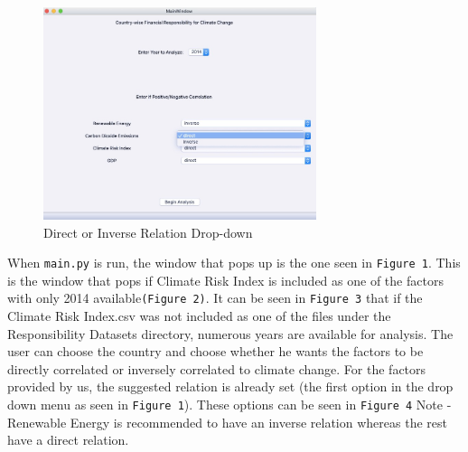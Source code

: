 \documentclass[fontsize=11pt]{article}
\begin{document}
    \begin{figure}[H]
        \centering
        \includegraphics[width=8cm]{Figure 4.jpeg}
        \caption{Direct or Inverse Relation Drop-down}
    \end{figure}
    
    When \texttt{main.py} is run, the window that pops up is the one seen in \texttt{Figure 1}. This is the window that pops if Climate Risk Index
    is included as one of the factors with only 2014 available\texttt{(Figure 2)}. It can be seen in \texttt{Figure 3} that if the Climate Risk Index.csv was not included as one of the files
    under the Responsibility Datasets directory, numerous years are available for analysis.\newline
    The user can choose the country and choose whether he wants the factors to be directly correlated or inversely correlated
    to climate change. For the factors provided by us, the suggested relation is already set (the first option in the drop down
    menu as seen in \texttt{Figure 1}). These options can be seen in \texttt{Figure 4}\newline
    Note - Renewable Energy is recommended to have an inverse relation whereas the rest have a direct relation.\newline
    
\end{document}
